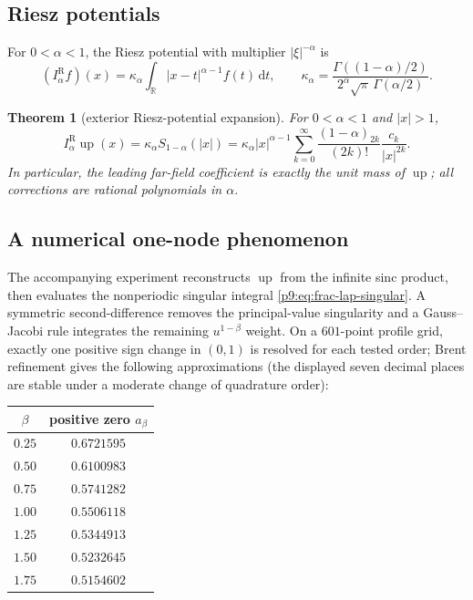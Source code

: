 \documentclass[11pt,oneside]{article}
\newtheorem{theorem}{Theorem}[section]
\theoremstyle{definition}
\theoremstyle{remark}
\newcommand{\Up}{\operatorname{up}}
\newcommand{\R}{\mathbb R}
\newcommand{\dd}{\,\mathrm d}
\newcommand{\1}{\mathbf 1}
\begin{document}
\subsection{Riesz potentials}

For $0<\alpha<1$, the Riesz potential with multiplier $|\xi|^{-\alpha}$ is
\begin{equation}
 (I_\alpha^{\mathrm R}f)(x)
 =\kappa_\alpha\int_{\R}|x-t|^{\alpha-1}f(t)\dd t,
 \qquad
 \kappa_\alpha=
 \frac{\Gamma((1-\alpha)/2)}
      {2^\alpha\sqrt\pi\,\Gamma(\alpha/2)}.
 \label{p9:eq:Riesz-potential}
\end{equation}

\begin{theorem}[exterior Riesz-potential expansion]
For $0<\alpha<1$ and $|x|>1$,
\begin{equation}
 I_\alpha^{\mathrm R}\Up(x)
 =\kappa_\alpha S_{1-\alpha}(|x|)
 =\kappa_\alpha|x|^{\alpha-1}
  \sum_{k=0}^{\infty}
   \frac{(1-\alpha)_{2k}}{(2k)!}
   \frac{c_k}{|x|^{2k}}.
 \label{p9:eq:Riesz-potential-series}
\end{equation}
In particular, the leading far-field coefficient is exactly the unit mass of
$\Up$; all corrections are rational polynomials in $\alpha$.
\end{theorem}

\subsection{A numerical one-node phenomenon}

The accompanying experiment reconstructs $\Up$ from the infinite sinc product, then
evaluates the nonperiodic singular integral \cref{p9:eq:frac-lap-singular}.  A
symmetric second-difference removes the principal-value singularity and a
Gauss--Jacobi rule integrates the remaining $u^{1-\beta}$ weight.  On a
$601$-point profile grid, exactly one positive sign change in $(0,1)$ is
resolved for each tested order; Brent refinement gives the following
approximations (the displayed seven decimal places are stable under a moderate
change of quadrature order):
\begin{center}
\begin{tabular}{@{}c@{\qquad}c@{}}
\toprule
$\beta$ & positive zero $a_\beta$\\
\midrule
$0.25$ & $0.6721595$\\
$0.50$ & $0.6100983$\\
$0.75$ & $0.5741282$\\
$1.00$ & $0.5506118$\\
$1.25$ & $0.5344913$\\
$1.50$ & $0.5232645$\\
$1.75$ & $0.5154602$\\
\bottomrule
\end{tabular}
\end{center}
\end{document}

